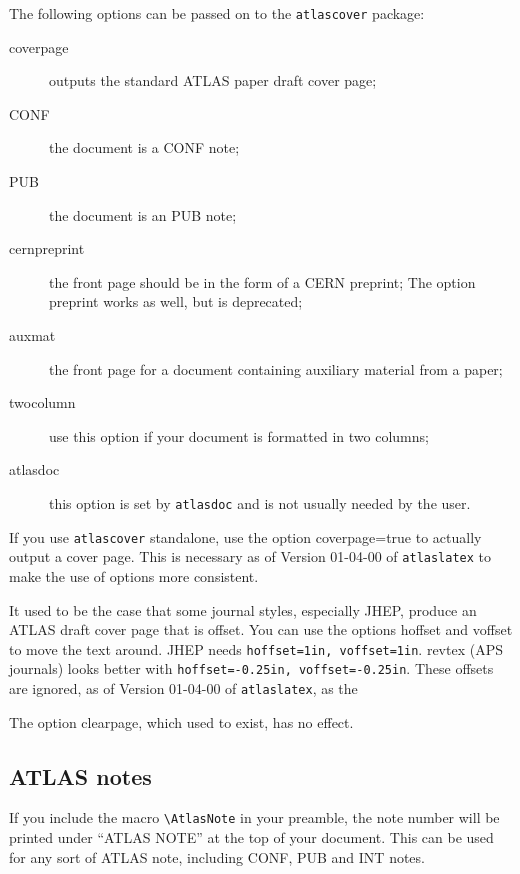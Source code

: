 \documentclass[atlasstyle,UKenglish]{latex/atlasdoc}
\newcommand{\Macro}[1]{\texttt{\textbackslash #1}\xspace}
\newcommand{\Option}[1]{\textsf{#1}\xspace}
\newcommand{\Package}[1]{\texttt{#1}\xspace}
\begin{document}
The following options can be passed on to the \Package{atlascover} package:
\begin{description}
\item[\Option{coverpage}] outputs the standard ATLAS paper draft cover page;
\item[\Option{CONF}] the document is a CONF note;
\item[\Option{PUB}] the document is an PUB note;
\item[\Option{cernpreprint}] the front page should be in the form of a CERN preprint;
  The option \Option{preprint} works as well, but is deprecated;
\item[\Option{auxmat}] the front page for a document containing auxiliary material from a paper;
\item[\Option{twocolumn}] use this option if your document is formatted in two columns;
\item[\Option{atlasdoc}] this option is set by \Package{atlasdoc} and is not usually needed by the user.
\end{description}

If you use \Package{atlascover} standalone, use the option \Option{coverpage=true} to
actually output a cover page. 
This is necessary as of Version 01-04-00 of \Package{atlaslatex} to make the use of options more consistent.

It used to be the case that some journal styles, especially JHEP,
produce an ATLAS draft cover page that is offset.
You can use the options \Option{hoffset} and \Option{voffset} to move the text around.
JHEP needs \verb|hoffset=1in, voffset=1in|.
revtex (APS journals) looks better with  \verb|hoffset=-0.25in, voffset=-0.25in|.
These offsets are ignored, as of Version 01-04-00 of \Package{atlaslatex}, as the

The option \Option{clearpage}, which used to exist, has no effect.

\subsection{ATLAS notes}
\label{sec:note}

If you include the macro \Macro{AtlasNote} in your preamble,
the note number will be printed under ``ATLAS NOTE'' at the top of your document.
This can be used for any sort of ATLAS note, including CONF, PUB and INT notes.
\end{document}
